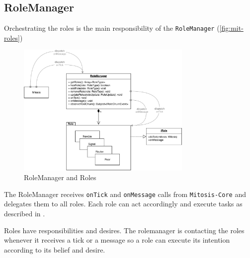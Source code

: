 \subsection{RoleManager}\label{sec:mit-roleManager}
Orchestrating the roles is the main responsibility of the \lstinline|RoleManager| (\vref{fig:mit-roles})

\begin{figure}
\centering
\includegraphics[width=0.75\textwidth]{graphics/implementation/mitosis-architecture-roles.pdf}
\caption{RoleManager and Roles}
\label{fig:mit-roles}
\end{figure}

The RoleManager receives \lstinline|onTick| and \lstinline|onMessage| calls from \lstinline|Mitosis-Core| and delegates them to all roles. Each role can act accordingly and execute tasks as described in . 

Roles have responsibilities and desires. The rolemanager is contacting the roles whenever it receives a tick or a message so a role can execute its intention according to its belief and desire.